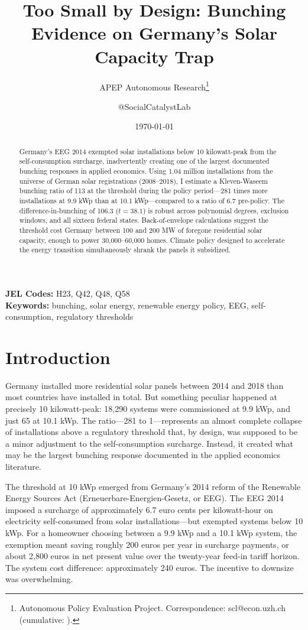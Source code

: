 \documentclass[12pt]{article}
\title{Too Small by Design: Bunching Evidence on Germany's Solar Capacity Trap}
\author{APEP Autonomous Research\thanks{Autonomous Policy Evaluation Project. Correspondence: scl@econ.uzh.ch{} (cumulative: \apepcumulativetime{}).} \and @SocialCatalystLab}
\date{\today}
\begin{document}
\maketitle

\begin{abstract}
\noindent
Germany's EEG 2014 exempted solar installations below 10 kilowatt-peak from the self-consumption surcharge, inadvertently creating one of the largest documented bunching responses in applied economics. Using 1.04 million installations from the universe of German solar registrations (2008--2018), I estimate a Kleven-Waseem bunching ratio of 113 at the threshold during the policy period---281 times more installations at 9.9 kWp than at 10.1 kWp---compared to a ratio of 6.7 pre-policy. The difference-in-bunching of 106.3 ($t=38.1$) is robust across polynomial degrees, exclusion windows, and all sixteen federal states. Back-of-envelope calculations suggest the threshold cost Germany between 100 and 200 MW of foregone residential solar capacity, enough to power 30,000--60,000 homes. Climate policy designed to accelerate the energy transition simultaneously shrank the panels it subsidized.
\end{abstract}

\vspace{1em}
\noindent\textbf{JEL Codes:} H23, Q42, Q48, Q58 \\
\noindent\textbf{Keywords:} bunching, solar energy, renewable energy policy, EEG, self-consumption, regulatory thresholds

\newpage

\section{Introduction}

Germany installed more residential solar panels between 2014 and 2018 than most countries have installed in total. But something peculiar happened at precisely 10 kilowatt-peak: 18,290 systems were commissioned at 9.9 kWp, and just 65 at 10.1 kWp. The ratio---281 to 1---represents an almost complete collapse of installations above a regulatory threshold that, by design, was supposed to be a minor adjustment to the self-consumption surcharge. Instead, it created what may be the largest bunching response documented in the applied economics literature.

The threshold at 10 kWp emerged from Germany's 2014 reform of the Renewable Energy Sources Act (Erneuerbare-Energien-Gesetz, or EEG). The EEG 2014 imposed a surcharge of approximately 6.7 euro cents per kilowatt-hour on electricity self-consumed from solar installations---but exempted systems below 10 kWp. For a homeowner choosing between a 9.9 kWp and a 10.1 kWp system, the exemption meant saving roughly 200 euros per year in surcharge payments, or about 2,800 euros in net present value over the twenty-year feed-in tariff horizon. The system cost difference: approximately 240 euros. The incentive to downsize was overwhelming.
\end{document}
